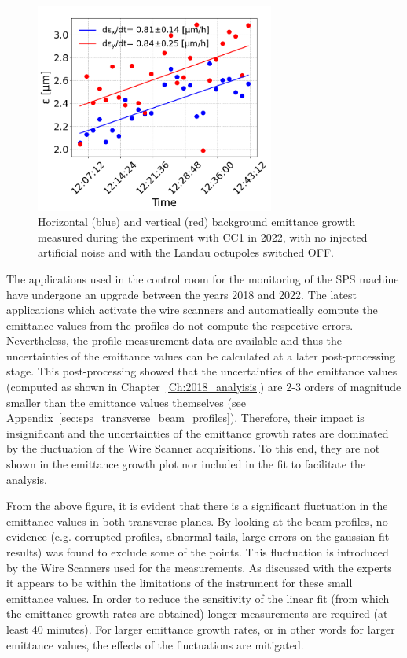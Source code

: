 \begin{figure}[!h] %
   \centering         
   \includegraphics[width=0.7\textwidth]{images/Ch8/cc_md_2022_background_in_scan.png}
       \caption{Horizontal (blue) and vertical (red) background emittance growth measured during the experiment with CC1 in 2022, with no injected artificial noise and with the Landau octupoles switched OFF.}
       \label{fig:cc_md_2022_background_growth_in_scan}
\end{figure}

The applications used in the control room for the monitoring of the SPS machine have undergone an upgrade between the years 2018 and 2022. The latest applications which activate the wire scanners and automatically compute the emittance values from the profiles do not compute the respective errors. Nevertheless, the profile measurement data are available and thus the uncertainties of the emittance values can be calculated at a later post-processing stage. This post-processing showed that the uncertainties of the emittance values (computed as shown in Chapter~\ref{Ch:2018_analyisis}) are 2-3 orders of magnitude smaller than the emittance values themselves (see Appendix~\ref{sec:sps_transverse_beam_profiles}). Therefore, their impact is insignificant and the uncertainties of the emittance growth rates are dominated by the fluctuation of the Wire Scanner acquisitions. To this end, they are not shown in the emittance growth plot nor included in the fit to facilitate the analysis.

From the above figure, it is evident that there is a significant fluctuation in the emittance values in both transverse planes. By looking at the beam profiles, no evidence (e.g. corrupted profiles, abnormal tails, large errors on the gaussian fit results) was found to exclude some of the points. This fluctuation is introduced by the Wire Scanners used for the measurements. As discussed with the experts it appears to be within the limitations of the instrument for these small emittance values. In order to reduce the sensitivity of the linear fit (from which the emittance growth rates are obtained) longer measurements are required (at least 40 minutes). For larger emittance growth rates, or in other words for larger emittance values, the effects of the fluctuations are mitigated.

